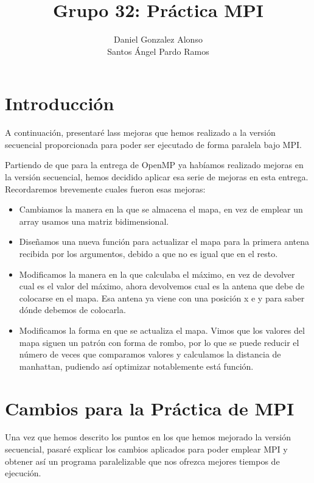 \documentclass[8pt]{article}
\title{Grupo 32: Práctica MPI}
\author{Daniel Gonzalez Alonso\\
		Santos Ángel Pardo Ramos}
\begin{document}
\maketitle

\section{Introducción}

A continuación, presentaré lass mejoras que hemos realizado a la versión secuencial proporcionada para poder ser ejecutado de forma paralela bajo MPI.

Partiendo de que para la entrega de OpenMP ya habíamos realizado mejoras en la versión secuencial, hemos decidido aplicar esa serie de mejoras en esta entrega. Recordaremos brevemente cuales fueron esas mejoras:

\begin{itemize}
  \item Cambiamos la manera en la que se almacena el mapa, en vez de emplear un array usamos una matriz bidimensional.
  
  \item Diseñamos una nueva función para actualizar el mapa para la primera antena recibida por los argumentos, debido a que no es igual que en el resto.
  
  \item Modificamos la manera en la que calculaba el máximo, en vez de devolver cual es el valor del máximo, ahora devolvemos cual es la antena que debe de colocarse en el mapa. Esa antena ya viene con una posición x e y para saber dónde debemos de colocarla.
  
  \item Modificamos la forma en que se actualiza el mapa. Vimos que los valores del mapa siguen un patrón con forma de rombo, por lo que se puede reducir el número de veces que comparamos valores y calculamos la distancia de manhattan, pudiendo así optimizar notablemente está función.
\end{itemize}

\section{Cambios para la Práctica de MPI}
Una vez que hemos descrito los puntos en los que hemos mejorado la versión secuencial, pasaré explicar los cambios aplicados para poder emplear MPI y obtener así un programa paralelizable que nos ofrezca mejores tiempos de ejecución.
\end{document}
